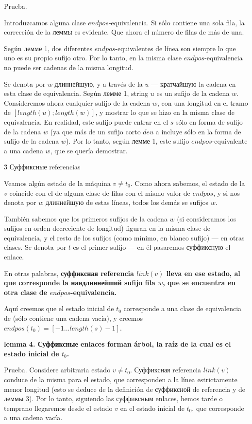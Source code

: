 Prueba.

Introduzcamos alguna clase $endpos$-equivalencia. Si sólo contiene una sola fila, la corrección de la леммы es evidente. Que ahora el número de filas de más de una.

Según лемме 1, dos diferentes $endpos$-equivalentes de línea son siempre lo que uno es su propio sufijo otro. Por lo tanto, en la misma clase $endpos$-equivalencia no puede ser cadenas de la misma longitud.

Se denota por $w$ длиннейшую, y a través de la $u$ --- кратчайшую la cadena en esta clase de equivalencia. Según лемме 1, string $u$ es un sufijo de la cadena $w$. Consideremos ahora cualquier sufijo de la cadena $w$, con una longitud en el tramo de $[length(u); length(w)]$, y mostrar lo que se hizo en la misma clase de equivalencia. En realidad, este sufijo puede entrar en el $s$ sólo en forma de sufijo de la cadena $w$ (ya que más de un sufijo corto $de u$ a incluye sólo en la forma de sufijo de la cadena $w$). Por lo tanto, según лемме 1, este sufijo $endpos$-equivalente a una cadena $w$, que se quería demostrar.


\h3{ Суффиксные referencias }

Veamos algún estado de la máquina $v \ne t_0$. Como ahora sabemos, el estado de la $v$ coincide con el de alguna clase de filas con el mismo valor de $endpos$, y si nos denota por $w$ длиннейшую de estas líneas, todos los demás se sufijos $w$.

También sabemos que los primeros sufijos de la cadena $w$ (si consideramos los sufijos en orden decreciente de longitud) figuran en la misma clase de equivalencia, y el resto de los sufijos (como mínimo, en blanco sufijo) --- en otras clases. Se denota por $t$ es el primer sufijo --- en él pasaremos суффиксную el enlace.

En otras palabras, \bf{суффиксная referencia} $link(v)$ lleva en ese estado, al que corresponde la \bf{наидлиннейший sufijo} fila $w$, que se encuentra en otra clase de $endpos$-equivalencia.

Aquí creemos que el estado inicial de $t_0$ corresponde a una clase de equivalencia de (sólo contiene una cadena vacía), y creemos $endpos(t_0) = [-1 \ldots length(s)-1]$.

\bf{lemma 4}. Суффиксные enlaces forman \bf{árbol}, la raíz de la cual es el estado inicial de $t_0$.

Prueba. Considere arbitraria estado $v \ne t_0$. Суффиксная referencia $link(v)$ conduce de la misma para el estado, que corresponden a la línea estrictamente menor longitud (esto se deduce de la definición de суффиксной de referencia y de леммы 3). Por lo tanto, siguiendo las суффиксным enlaces, hemos tarde o temprano llegaremos desde el estado $v$ en el estado inicial de $t_0$, que corresponde a una cadena vacía.

